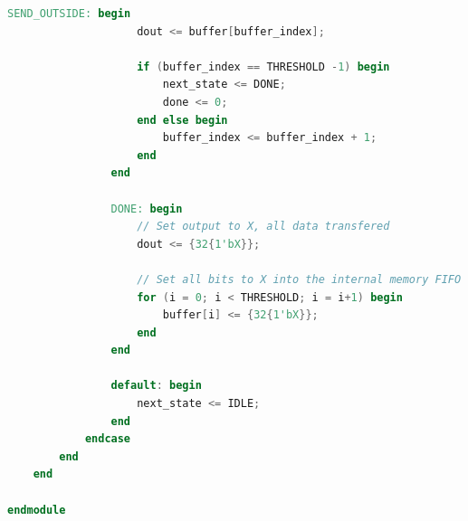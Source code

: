 \begin{lstlisting}[language=verilog,frame=single,caption={Código fuente de la cola FIFO conversora a formato original},showstringspaces=false,label=lst:legacyAxis2fifo]
                SEND_OUTSIDE: begin
                    dout <= buffer[buffer_index];
                    
                    if (buffer_index == THRESHOLD -1) begin
                        next_state <= DONE;
                        done <= 0;
                    end else begin
				        buffer_index <= buffer_index + 1;
                    end
                end
                
                DONE: begin
                    // Set output to X, all data transfered
                    dout <= {32{1'bX}};
                    
                    // Set all bits to X into the internal memory FIFO
                    for (i = 0; i < THRESHOLD; i = i+1) begin
                        buffer[i] <= {32{1'bX}}; 
                    end
                end

                default: begin
                    next_state <= IDLE;
                end
            endcase
        end
    end

endmodule
\end{lstlisting}

